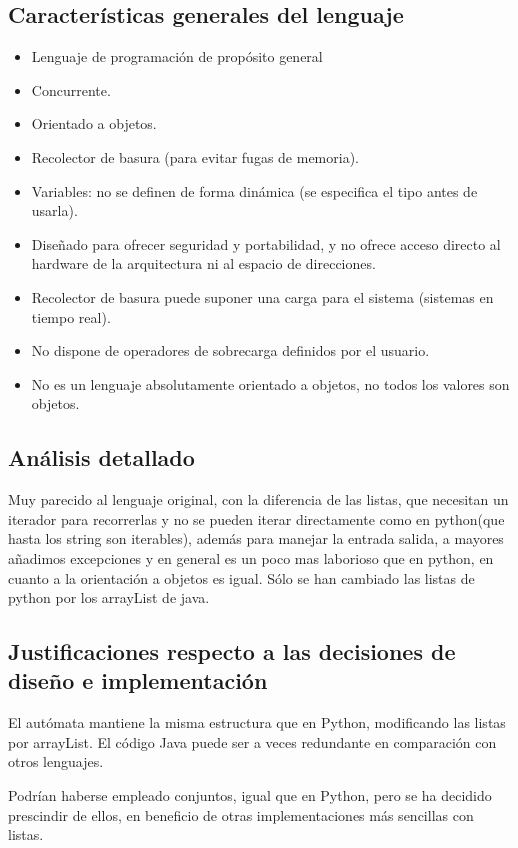 \documentclass[12pt,a4paper]{article}
\begin{document}
    \subsection{Características generales del lenguaje}
    \begin{itemize}
    \item Lenguaje de programación de propósito general
    \item Concurrente.
    \item Orientado a objetos.
    \item Recolector de basura (para evitar fugas de memoria).
    \item Variables: no se definen de forma dinámica (se especifica el tipo antes de 
    usarla).
    \item Diseñado para ofrecer seguridad y portabilidad, y no ofrece acceso directo 
    al hardware de la arquitectura ni al espacio de direcciones.
    \item Recolector de basura puede suponer una carga para el sistema (sistemas en 
    tiempo real).
    \item No dispone de operadores de sobrecarga definidos por el usuario.
    \item No es un lenguaje absolutamente orientado a objetos, no todos los valores 
    son objetos.
    \end{itemize}
    
    \subsection{Análisis detallado}
    
    Muy parecido al lenguaje original, con la diferencia de las listas, que necesitan un iterador para recorrerlas y no se pueden iterar directamente como en python(que hasta los string son iterables), además para manejar la entrada salida, a mayores añadimos excepciones y en general es un poco mas laborioso que
    en python, en cuanto a la orientación a objetos es igual. Sólo se han cambiado las listas de python por los arrayList de java.
    \subsection{Justificaciones respecto a las decisiones de diseño e implementación}
El autómata mantiene la misma estructura que en Python, modificando las listas 
por arrayList. El código Java puede ser a veces redundante en comparación con 
otros lenguajes.

Podrían haberse empleado conjuntos, igual que en Python, pero se ha decidido 
prescindir de ellos, en beneficio de otras implementaciones más sencillas con 
listas.
\end{document}
